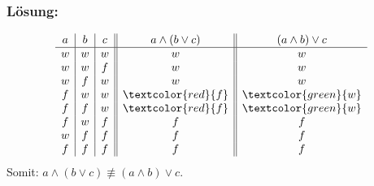 \begin{frame}\frametitle{Lösung:}

$$
	\begin{array}{c | c | c || c || c}
		a	&b	&c	& a\land (b \lor c)	& (a\land b) \lor c	\\ \hline
		w	&w	&w	& w				& w				\\
		w	&w	&f	& w				& w				\\
		w	&f	&w	& w				& w				\\
		f	&w	&w	& \textcolor{red}{f}				& \textcolor{green}{w}				\\
		f	&f	&w	&\textcolor{red}{f}			&\textcolor{green}{w}			\\
		f	&w	&f	&{ f}				& f				\\
		w	&f	&f	& f				& f				\\
		f	&f	&f	& f				& f				\\
	\end{array}
$$
\vfill
Somit: $a\land (b \lor c) \not\equiv (a\land b) \lor c$.


\end{frame}
%

%
